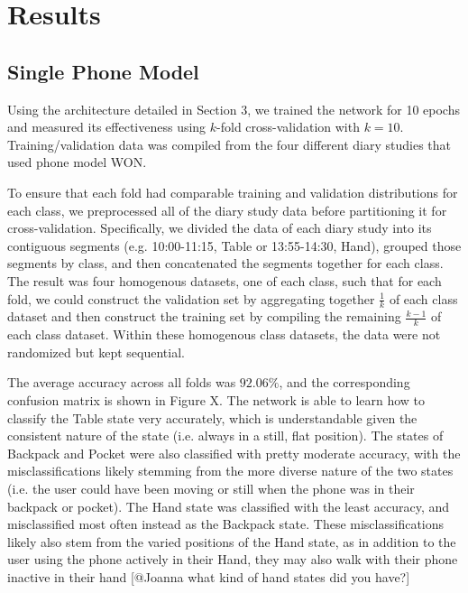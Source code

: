 \section{Results}
\subsection{Single Phone Model}
Using the architecture detailed in Section 3, we trained the network for 10 epochs
and measured its effectiveness using $k$-fold cross-validation with $k = 10$.
Training/validation data was compiled from the four different diary studies
that used phone model WON.

To ensure that each fold had comparable training and validation distributions 
for each class, we preprocessed all of the diary study data before partitioning it
for cross-validation. Specifically, we divided the data of each diary study into its 
contiguous segments (e.g. 10:00-11:15, Table or 13:55-14:30, Hand), grouped 
those segments by class, and then concatenated the segments together for each class. The result was four 
homogenous datasets, one of each class, such that for each fold, we could construct
the validation set by aggregating together $\frac{1}{k}$ of each class dataset and then
construct the training set by compiling the remaining $\frac{k - 1}{k}$ of each class dataset.
Within these homogenous class datasets, the data were not randomized but 
kept sequential.

The average accuracy across all folds was $92.06\%$, and the corresponding
confusion matrix is shown in Figure X. The network is able to learn how to 
classify the Table state very accurately, which is understandable given 
the consistent nature of the state (i.e. always in a still, flat position). The states
of Backpack and Pocket were also classified with pretty moderate accuracy,
with the misclassifications likely stemming from the more diverse nature of 
the two states (i.e. the user could have been moving or still when the phone was
in their backpack or pocket). The Hand state was classified with the least accuracy,
and misclassified most often instead as the Backpack state. These misclassifications
likely also stem from the varied positions of the Hand state, as in addition to the user
using the phone actively in their Hand, they may also walk with their phone inactive
in their hand [@Joanna what kind of hand states did you have?]

